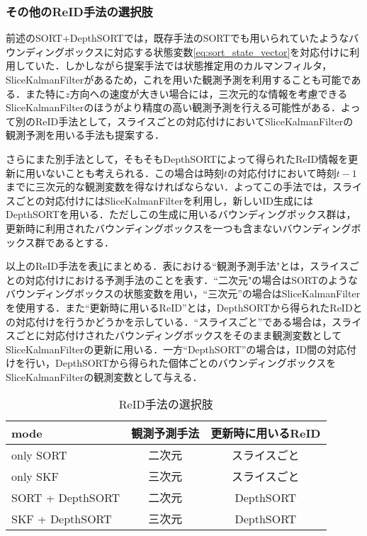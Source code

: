         \subsubsection{その他のReID手法の選択肢}

        前述のSORT+DepthSORTでは，既存手法のSORTでも用いられていたようなバウンディングボックスに対応する状態変数\ref{eq:sort_state_vector}を対応付けに利用していた．しかしながら提案手法では状態推定用のカルマンフィルタ，SliceKalmanFilterがあるため，これを用いた観測予測を利用することも可能である．また特に$z$方向への速度が大きい場合には，三次元的な情報を考慮できるSliceKalmanFilterのほうがより精度の高い観測予測を行える可能性がある．よって別のReID手法として，スライスごとの対応付けにおいてSliceKalmanFilterの観測予測を用いる手法も提案する．
        
        さらにまた別手法として，そもそもDepthSORTによって得られたReID情報を更新に用いないことも考えられる．この場合は時刻$t$の対応付けにおいて時刻$t-1$までに三次元的な観測変数を得なければならない．よってこの手法では，スライスごとの対応付けにはSliceKalmanFilterを利用し，新しいID生成にはDepthSORTを用いる．ただしこの生成に用いるバウンディングボックス群は，更新時に利用されたバウンディングボックスを一つも含まないバウンディングボックス群であるとする．

        以上のReID手法を表\ref{tab:reidentification_methods}にまとめる．表における``観測予測手法"とは，スライスごとの対応付けにおける予測手法のことを表す．``二次元"の場合はSORTのようなバウンディングボックスの状態変数を用い，``三次元''の場合はSliceKalmanFilterを使用する．また``更新時に用いるReID''とは，DepthSORTから得られたReIDとの対応付けを行うかどうかを示している．``スライスごと''である場合は，スライスごとに対応付けされたバウンディングボックスをそのまま観測変数としてSliceKalmanFilterの更新に用いる．一方``DepthSORT''の場合は，ID間の対応付けを行い，DepthSORTから得られた個体ごとのバウンディングボックスをSliceKalmanFilterの観測変数として与える．

        \begin{table}[t]
            \centering
            \caption[ReID手法の選択肢]{ReID手法の選択肢}
            \label{tab:reidentification_methods}
            \begin{tabular}{l|cc}
                \hline mode &  観測予測手法 & 更新時に用いるReID
                \\\hline \hline only SORT & 二次元 & スライスごと
                \\only SKF & 三次元 & スライスごと
                \\SORT + DepthSORT & 二次元 & DepthSORT
                \\SKF + DepthSORT & 三次元 & DepthSORT
            \end{tabular}
        \end{table}


